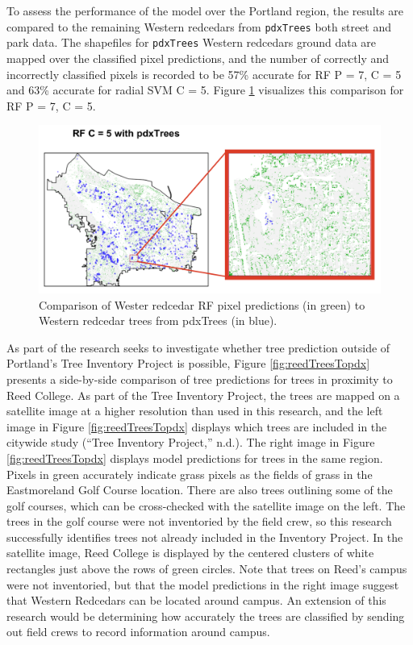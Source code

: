 \documentclass[12pt,twoside]{reedthesis}
\begin{document}
To assess the performance of the model over the Portland region, the results are compared to the remaining Western redcedars from \texttt{pdxTrees} both street and park data. The shapefiles for \texttt{pdxTrees} Western redcedars ground data are mapped over the classified pixel predictions, and the number of correctly and incorrectly classified pixels is recorded to be 57\% accurate for RF P = 7, C = 5 and 63\% accurate for radial SVM C = 5. Figure \ref{fig:resultsToStreet} visualizes this comparison for RF P = 7, C = 5.
\begin{figure}

{\centering \includegraphics[width=1\linewidth]{figure/resultsToStreet} 

}

\caption{Comparison of Wester redcedar RF pixel predictions (in green) to Western redcedar trees from pdxTrees (in blue).}\label{fig:resultsToStreet}
\end{figure}
As part of the research seeks to investigate whether tree prediction outside of Portland's Tree Inventory Project is possible, Figure \ref{fig:reedTreesTopdx} presents a side-by-side comparison of tree predictions for trees in proximity to Reed College. As part of the Tree Inventory Project, the trees are mapped on a satellite image at a higher resolution than used in this research, and the left image in Figure \ref{fig:reedTreesTopdx} displays which trees are included in the citywide study (``Tree Inventory Project,'' n.d.). The right image in Figure \ref{fig:reedTreesTopdx} displays model predictions for trees in the same region. Pixels in green accurately indicate grass pixels as the fields of grass in the Eastmoreland Golf Course location. There are also trees outlining some of the golf courses, which can be cross-checked with the satellite image on the left. The trees in the golf course were not inventoried by the field crew, so this research successfully identifies trees not already included in the Inventory Project. In the satellite image, Reed College is displayed by the centered clusters of white rectangles just above the rows of green circles. Note that trees on Reed's campus were not inventoried, but that the model predictions in the right image suggest that Western Redcedars can be located around campus. An extension of this research would be determining how accurately the trees are classified by sending out field crews to record information around campus.
\end{document}
